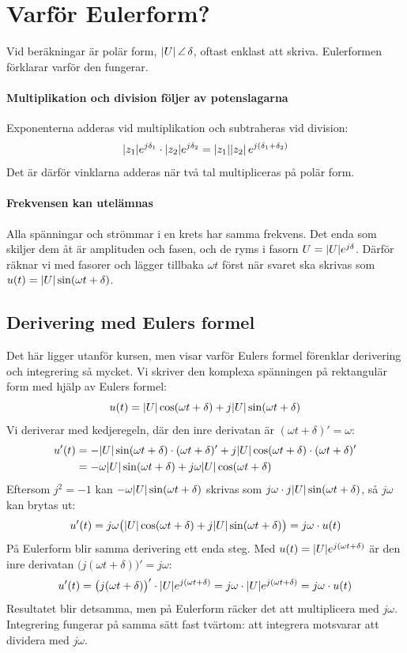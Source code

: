 \section{Varför Eulerform?}
\label{c16:sec:varfor}
Vid beräkningar är polär form, $\lvert U\rvert\,\angle\,\delta$, oftast enklast att skriva. Eulerformen
förklarar varför den fungerar.

\paragraph{Multiplikation och division följer av potenslagarna} Exponenterna adderas vid
multiplikation och subtraheras vid division:
\[
  \lvert z_1\rvert e^{j\delta_1} \cdot \lvert z_2\rvert e^{j\delta_2} = \lvert z_1\rvert\lvert z_2\rvert\,e^{j(\delta_1 + \delta_2)}
\]
Det är därför vinklarna adderas när två tal multipliceras på polär form.

\paragraph{Frekvensen kan utelämnas} Alla spänningar och strömmar i en krets har samma frekvens. Det
enda som skiljer dem åt är amplituden och fasen, och de ryms i fasorn $U = \lvert U\rvert e^{j\delta}$.
Därför räknar vi med fasorer och lägger tillbaka $\omega t$ först när svaret ska skrivas som
$u(t) = \lvert U\rvert\sin(\omega t + \delta)$.

\subsection{Derivering med Eulers formel}
Det här ligger utanför kursen, men visar
varför Eulers formel förenklar derivering och integrering så mycket. Vi skriver den komplexa
spänningen på rektangulär form med hjälp av Eulers formel:
\[
  u(t) = \lvert U\rvert\cos(\omega t + \delta) + j\lvert U\rvert\sin(\omega t + \delta)
\]
Vi deriverar med kedjeregeln, där den inre derivatan är $(\omega t + \delta)' = \omega$:
\begin{align*}
  u'(t) &= -\lvert U\rvert\sin(\omega t + \delta) \cdot (\omega t + \delta)'
           + j\lvert U\rvert\cos(\omega t + \delta) \cdot (\omega t + \delta)' \\
        &= -\omega\lvert U\rvert\sin(\omega t + \delta) + j\omega\lvert U\rvert\cos(\omega t + \delta)
\end{align*}
Eftersom $j^2 = -1$ kan $-\omega\lvert U\rvert\sin(\omega t + \delta)$ skrivas som
$j\omega \cdot j\lvert U\rvert\sin(\omega t + \delta)$, så $j\omega$ kan brytas ut:
\[
  u'(t) = j\omega\bigl(\lvert U\rvert\cos(\omega t + \delta) + j\lvert U\rvert\sin(\omega t + \delta)\bigr)
        = j\omega \cdot u(t)
\]
På Eulerform blir samma derivering ett enda steg. Med $u(t) = \lvert U\rvert e^{j(\omega t + \delta)}$ är
den inre derivatan $\bigl(j(\omega t + \delta)\bigr)' = j\omega$:
\[
  u'(t) = \bigl(j(\omega t + \delta)\bigr)' \cdot \lvert U\rvert e^{j(\omega t + \delta)}
        = j\omega \cdot \lvert U\rvert e^{j(\omega t + \delta)} = j\omega \cdot u(t)
\]
Resultatet blir detsamma, men på Eulerform räcker det att multiplicera med $j\omega$. Integrering
fungerar på samma sätt fast tvärtom: att integrera motsvarar att dividera med $j\omega$.


